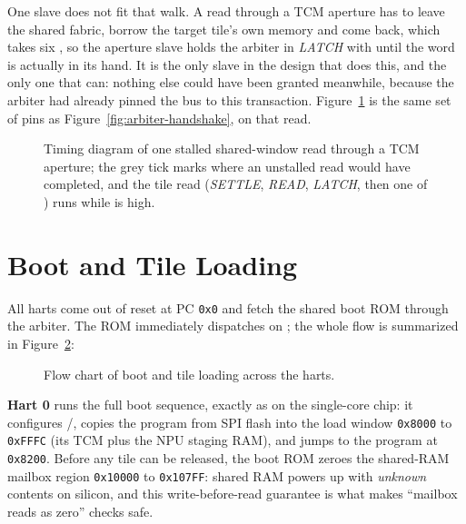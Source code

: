 \iforchpresent
One slave does not fit that walk. A read through a TCM aperture has to leave the shared fabric, borrow the target tile's own memory and come back, which takes six , so the aperture slave holds the arbiter in \textit{LATCH} with  until the word is actually in its hand. It is the only slave in the design that does this, and the only one that can: nothing else could have been granted meanwhile, because the arbiter had already pinned the bus to this transaction. Figure~\ref{fig:arbiter-stall} is the same set of pins as Figure~\ref{fig:arbiter-handshake}, on that read.

\begin{figure}[htpb]
	\centering
	
	\caption{Timing diagram of one stalled shared-window read through a TCM aperture; the grey tick marks where an unstalled read would have completed, and the tile read (\textit{SETTLE}, \textit{READ}, \textit{LATCH}, then one  of ) runs while  is high.}
	\label{fig:arbiter-stall}
\end{figure}
\fi



\section{Boot and Tile Loading} \label{ss:multicore-boot}

All \NumHartsWord{} harts come out of reset at PC \texttt{0x0} and fetch the shared boot ROM through the arbiter. The ROM immediately dispatches on ; the whole flow is summarized in Figure~\ref{fig:boot-flow}:

\begin{figure}[h]
	\centering
	
	\caption{Flow chart of boot and tile loading across the harts.}
	\label{fig:boot-flow}
\end{figure}

\textbf{Hart 0} runs the full boot sequence, exactly as on the single-core chip: it configures /, copies the program from SPI flash into the load window \texttt{0x8000} to \texttt{0xFFFC}\ifnpupresent{} (its TCM plus the NPU staging RAM)\fi, and jumps to the program at \texttt{0x8200}. Before any tile can be released, the boot ROM zeroes the shared-RAM mailbox region \texttt{0x10000} to \texttt{0x107FF}: shared RAM powers up with \textit{unknown} contents on silicon, and this write-before-read guarantee is what makes ``mailbox reads as zero'' checks safe.

